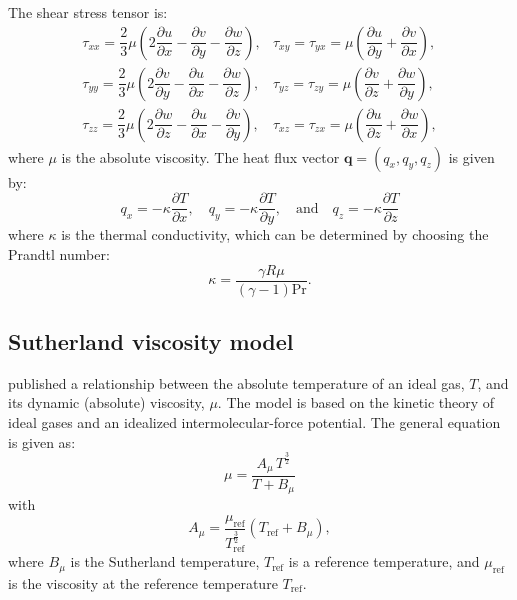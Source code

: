 \documentclass[10pt]{article}
\newcommand{\diff}[2] {\dfrac{\partial #1}{\partial #2}}
\begin{document}
The shear stress tensor is:
\begin{equation}
 \begin{array}{lll}
  \tau_{xx}= \dfrac{2}{3}  \mu \left( 2 \diff{u}{x} - \diff{v}{y} -\diff{w}{z} \right),
  &\tau_{xy}= \tau_{yx}=\mu \left( \diff{u}{y} + \diff{v}{x}\right),\\
  \tau_{yy}= \dfrac{2}{3}  \mu \left( 2 \diff{v}{y} - \diff{u}{x} -\diff{w}{z} \right),
  &\tau_{yz}= \tau_{zy}=\mu \left( \diff{v}{z} + \diff{w}{y}\right),\\
  \tau_{zz}= \dfrac{2}{3}  \mu \left( 2 \diff{w}{z} - \diff{u}{x} -\diff{v}{y} \right),
  &\tau_{xz}= \tau_{zx}=\mu \left( \diff{u}{z} + \diff{w}{x}\right),
 \end{array}
\end{equation}
where $\mu$ is the absolute viscosity. The heat flux vector $\mathbf{q}=(q_x,q_y,q_z)$ is given by:
\begin{equation}
 q_x = - \kappa \diff{T}{x}, \quad q_y = - \kappa \diff{T}{y}, \quad \mbox{and} \quad q_z = - \kappa \diff{T}{z}
 \end{equation}
where $\kappa$ is the thermal conductivity, which can be determined by choosing the Prandtl number:
\begin{equation}
 \label{eq:k}
\kappa = \dfrac{\gamma R \mu}{ (\gamma-1) \text{Pr}}.
\end{equation}



\subsection{Sutherland viscosity model}

\citet{Sutherland1893} published a relationship between the absolute temperature of an ideal gas, $T$,  and its dynamic (absolute) viscosity, $\mu$. The model is based on the kinetic theory of ideal gases and an idealized intermolecular-force potential. The general equation is given as:
\begin{equation}
\label{eq:Sutherland01}
 \mu  =\dfrac{A_\mu \, T^{\frac{3}{2}}}{T+B_\mu}
\end{equation}
with
\begin{equation}
\label{eq:Sutherland02}
A_\mu = \dfrac{\mu_\text{ref}}{T_{\text{ref}}^{\frac{3}{2}}}(T_\text{ref} + B_\mu),
\end{equation}
%
where $B_\mu$ is the Sutherland temperature, $T_{\text{ref}}$ is a reference temperature,  and $\mu_\text{ref}$ is the viscosity at the reference temperature $T_\text{ref}$.
\end{document}
